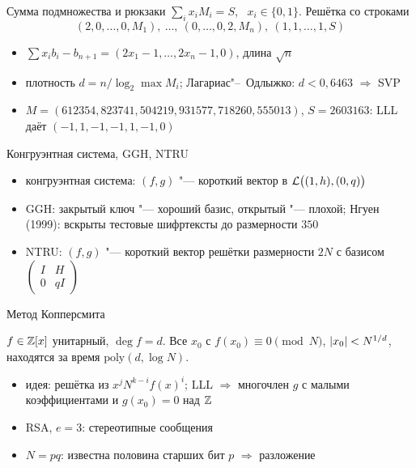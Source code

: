 \documentclass{ca-slides}
\begin{document}
\begin{canvasframe}{Сумма подмножества и рюкзаки}
  $\sum_i x_i M_i = S$, \ $x_i \in \{0, 1\}$. \quad Решётка со строками
  \[
    (2, 0, \dots, 0, M_1), \ \dots, \ (0, \dots, 0, 2, M_n), \ (1, 1, \dots, 1, S)
  \]
  \begin{itemize}
    \item $\sum x_i b_i - b_{n+1} = (2x_1 - 1, \dots, 2x_n - 1, 0)$, длина $\sqrt n$
    \item плотность $d = n / \log_2 \max M_i$; Лагариас"--~Одлыжко: $d < 0{,}6463$
      $\Rightarrow$ SVP
    \item $M = (612354, 823741, 504219, 931577, 718260, 555013)$, $S = 2603163$:
      LLL даёт $(-1, 1, -1, -1, 1, -1, 0)$
  \end{itemize}
\end{canvasframe}

\begin{canvasframe}{Конгруэнтная система, GGH, NTRU}
  \begin{itemize}
    \item конгруэнтная система: $(f, g)$ "--- короткий вектор в $\mathcal{L}\bigl((1, h), (0, q)\bigr)$
    \item GGH: закрытый ключ "--- хороший базис, открытый "--- плохой; Нгуен (1999):
      вскрыты тестовые шифртексты до размерности $350$
    \item NTRU: $(f, g)$ "--- короткий вектор решётки размерности $2N$
      с базисом $\begin{pmatrix} I & H \\ 0 & qI\end{pmatrix}$
  \end{itemize}
  \notearea[0.3\textheight]
\end{canvasframe}

\begin{canvasframe}{Метод Копперсмита}
  \begin{theorem}
    $f \in \mathbb{Z}[x]$ унитарный, $\deg f = d$. Все $x_0$ с $f(x_0) \equiv 0 \pmod N$,
    $\lvert x_0\rvert < N^{1/d}$, находятся за время $\mathrm{poly}(d, \log N)$.
  \end{theorem}
  \begin{itemize}
    \item идея: решётка из $x^j N^{k-i} f(x)^i$; LLL $\Rightarrow$ многочлен $g$ с малыми
      коэффициентами и $g(x_0) = 0$ над $\mathbb{Z}$
    \item RSA, $e = 3$: стереотипные сообщения
    \item $N = pq$: известна половина старших бит $p$ $\Rightarrow$ разложение
  \end{itemize}
\end{canvasframe}
\end{document}
